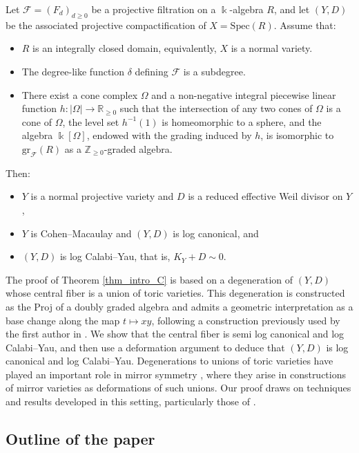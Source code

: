 \documentclass[12pt,letterpaper, reqno]{amsart}
\theoremstyle{defstyle} \newtheorem{definition}[theorem]{Definition}
\theoremstyle{remark}
\numberwithin{equation}{section}
\numberwithin{figure}{section}
\newcommand{\cF} {\mathcal{F}}
\newcommand{\Spec} {\mathrm{Spec}}
\newcommand{\gr} {\mathrm{gr}}
\newcommand{\kk} {\Bbbk}
\newcommand{\RR} {\mathbb{R}}
\newcommand{\ZZ} {\mathbb{Z}}
\begin{document}
\begin{citedthm}
\label{thm_intro_C}
Let $\cF=(F_d)_{d\geq 0}$ be a projective filtration on a $\kk$-algebra $R$, and let $(Y,D)$ be the associated projective compactification of $X=\Spec(R)$. Assume that:
\begin{itemize}
\item[(i)] $R$ is an integrally closed domain, equivalently, $X$ is a normal variety.
\item[(ii)] The degree-like function $\delta$ defining $\cF$ is a subdegree.
\item[(iii)] There exist a cone complex $\Omega$ and a non-negative integral piecewise linear function $ h:|\Omega|\longrightarrow \RR_{\geq 0}$ such that the intersection of any two cones of $\Omega$ is a cone of $\Omega$, the level set $h^{-1}(1)$ is homeomorphic to a sphere, and the algebra $\kk[\Omega]$, endowed with the grading induced by $h$, is isomorphic to $\gr_{\cF}(R)$ as a $\ZZ_{\geq 0}$-graded algebra.
\end{itemize}
Then:
\begin{itemize}
\item[(i)] $Y$ is a normal projective variety and $D$ is a reduced effective Weil divisor on $Y$,
\item[(ii)] $Y$ is Cohen--Macaulay and $(Y,D)$ is log canonical, and
\item[(iii)] $(Y,D)$ is log Calabi--Yau, that is, $K_Y+D\sim 0$.
\end{itemize}
\end{citedthm}

The proof of Theorem \ref{thm_intro_C} is based on a degeneration of $(Y,D)$ whose central fiber is a union of toric varieties. This degeneration is constructed as the Proj of a doubly graded algebra and admits a geometric interpretation as a base change along the map $t \mapsto xy$, following a construction previously used by the first author in \cite[Theorem 3.2]{Arguzcorals}. We show that the central fiber is semi log canonical and log Calabi--Yau, and then use a deformation argument to deduce that $(Y,D)$ is log canonical and log Calabi--Yau. Degenerations to unions of toric varieties have played an important role in mirror symmetry \cite{AAB2024ksba, GHK1, GHKK, GHS, GS2019intrinsic, HKY20, keel2024log}, where they arise in constructions of mirror varieties as deformations of such unions. Our proof draws on techniques and results developed in this setting, particularly those of \cite{GHKK, keel2024log}.

 
\subsection{Outline of the paper} 
\end{document}
